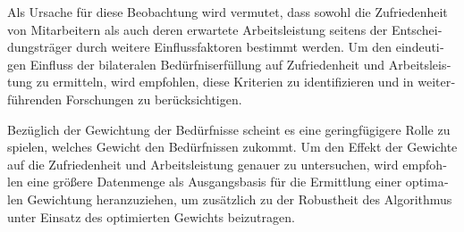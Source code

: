 \begin{otherlanguage}{ngerman}
Als Ursache für diese Beobachtung wird vermutet, dass sowohl die Zufriedenheit von Mitarbeitern als auch deren erwartete Arbeitsleistung seitens der Entscheidungsträger durch weitere Einflussfaktoren bestimmt werden.
Um den eindeutigen Einfluss der bilateralen Bedürfniserfüllung auf Zufriedenheit und Arbeitsleistung zu ermitteln, wird empfohlen, diese Kriterien zu identifizieren und in weiterführenden Forschungen zu berücksichtigen.

Bezüglich der Gewichtung der Bedürfnisse scheint es eine geringfügigere Rolle zu spielen, welches Gewicht den Bedürfnissen zukommt.
Um den Effekt der Gewichte auf die Zufriedenheit und Arbeitsleistung genauer zu untersuchen, wird empfohlen eine größere Datenmenge als Ausgangsbasis für die Ermittlung einer optimalen Gewichtung heranzuziehen, um zusätzlich zu der Robustheit des Algorithmus unter Einsatz des optimierten Gewichts beizutragen.



\end{otherlanguage}
